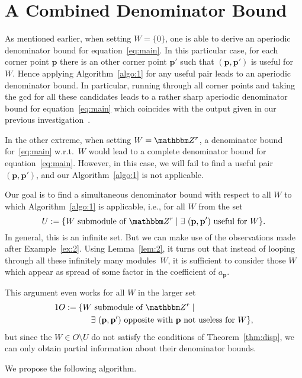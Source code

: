\documentclass[a4paper]{sig-alternate}
\let\set\mathbbm
\def\vec#1{\mathbf{#1}}
\begin{document}
\section{A Combined Denominator Bound}

As mentioned earlier, when setting $W=\{0\}$, one is able to derive an aperiodic
denominator bound for equation~\eqref{eq:main}. In this particular case, for
each corner point $\vec p$ there is an other corner point $\vec p'$ such that
$(\vec p,\vec p')$ is useful for $W$. Hence applying Algorithm~\ref{algo:1} for
any useful pair leads to an aperiodic denominator bound. In particular, running
through all corner points and taking the gcd for all these candidates leads to a
rather sharp aperiodic denominator bound for equation~\eqref{eq:main} which
coincides with the output given in our previous investigation~\cite{kauers10b}.

In the other extreme, when setting $W=\set Z^r$, a denominator bound
for~\eqref{eq:main} w.r.t.\ $W$ would lead to a complete denominator bound for
equation~\eqref{eq:main}. However, in this case, we will fail to find 
a useful pair $(\vec p,\vec p')$, and our Algorithm~\ref{algo:1} is not
applicable.

Our goal is to find a simultaneous denominator bound with respect to all $W$
to which Algorithm~\ref{algo:1} is applicable, i.e., for all $W$ from the set
$$
 U:=\{W\text{ submodule of }\set Z^r\mid \exists\ (\vec p,\vec p') \text{ useful for }W\}.
$$
In general, this is an infinite set. But we can make use of the observations
made after Example~\ref{ex:2}. Using Lemma~\ref{lem:2}, it turns out that instead 
of looping through all these infinitely many modules~$W$, it is sufficient to
consider those $W$ which appear as spread of some factor in the coefficient of
$a_{\vec p}$.

This argument even works for all $W$ in the larger set
\begin{alignat*}1
O:=\{&W\text{ submodule of }\set Z^r\mid\\
&\quad \exists\ (\vec p,\vec p') \text{ opposite with $\vec p$ not useless for $W$}\},
\end{alignat*}
but since the $W\in O\setminus U$ do not satisfy the conditions of Theorem~\ref{thm:disp},
we can only obtain partial information about their denominator bounds. 

We propose the following algorithm. 
\end{document}
